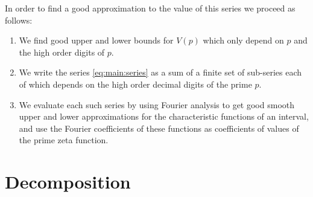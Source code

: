 \documentclass{article}
\begin{document}
In order to find a good approximation to the value of this series we
proceed as follows:

\begin{enumerate}
\item We find good upper and lower bounds for $V(p)$ which only depend
  on $p$ and the high order digits of $p$.
\item We write the series \eqref{eq:main:series} as a sum of a finite
  set of sub-series
  each of which depends on the high order decimal digits of the prime
  $p$.
\item We evaluate each such series by using Fourier analysis to get
  good smooth upper and lower approximations for the characteristic
  functions of an interval, and use the Fourier coefficients of these
  functions as coefficients of values of the prime zeta function.
\end{enumerate}
\section{Decomposition}
\label{sec:decomp}
\end{document}
